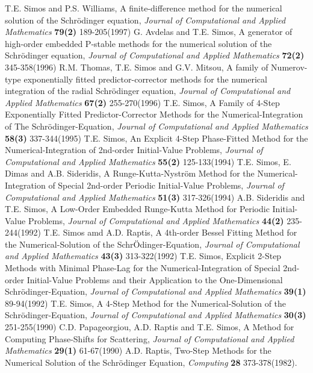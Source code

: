 \documentclass[numreferences]{kluwer}
\begin{document}
\begin{article}
\begin{thebibliography}{120}
 T.E. Simos and P.S. Williams, A finite-difference method for the numerical solution of the Schr\"odinger equation, {\it Journal of Computational and Applied Mathematics} {\bf 79(2)} 189-205(1997)
 G. Avdelas and T.E. Simos, A generator of high-order embedded P-stable methods for the numerical solution of the
Schr\"odinger equation, {\it Journal of Computational and Applied
Mathematics} {\bf 72(2)}  345-358(1996)
 R.M. Thomas, T.E. Simos and G.V. Mitsou, A family of Numerov-type exponentially fitted predictor-corrector methods for the
numerical integration of the radial Schr\"odinger equation, {\it
Journal of Computational and Applied Mathematics} {\bf 67(2)}
255-270(1996)
 T.E. Simos, A Family of 4-Step Exponentially Fitted Predictor-Corrector Methods for the Numerical-Integration of
The Schr\"odinger-Equation, {\it Journal of Computational and
Applied Mathematics} {\bf 58(3)}   337-344(1995)
 T.E. Simos, An Explicit 4-Step Phase-Fitted Method for the Numerical-Integration of 2nd-order Initial-Value Problems, {\it Journal of Computational and Applied Mathematics} {\bf 55(2)} 125-133(1994)
 T.E. Simos, E. Dimas and A.B. Sideridis, A Runge-Kutta-Nystr\"om Method for the Numerical-Integration of Special 2nd-order
Periodic Initial-Value Problems, {\it Journal of Computational and
Applied Mathematics} {\bf 51(3)} 317-326(1994)
 A.B. Sideridis and T.E. Simos, A Low-Order Embedded Runge-Kutta Method for Periodic Initial-Value Problems, {\it Journal of Computational and Applied Mathematics} {\bf 44(2)} 235-244(1992)
 T.E. Simos amd A.D. Raptis, A 4th-order Bessel Fitting Method for the Numerical-Solution of the Schr\"Odinger-Equation, {\it
Journal of Computational and Applied Mathematics} {\bf 43(3)}
313-322(1992)
 T.E. Simos, Explicit 2-Step Methods with Minimal Phase-Lag for the Numerical-Integration of Special 2nd-order Initial-Value
Problems and their Application to the One-Dimensional
Schr\"odinger-Equation, {\it Journal of Computational and Applied
Mathematics} {\bf 39(1)} 89-94(1992)
 T.E. Simos, A 4-Step Method for the Numerical-Solution of the Schr\"odinger-Equation, {\it Journal of Computational and Applied Mathematics} {\bf 30(3)} 251-255(1990)
 C.D. Papageorgiou, A.D. Raptis and T.E. Simos, A Method for Computing Phase-Shifts for Scattering, {\it Journal of Computational and Applied
Mathematics} {\bf 29(1)} 61-67(1990)
 A.D. Raptis, Two-Step Methods for the Numerical Solution  of the Schr\"odinger Equation, {\it Computing} {\bf 28} 373-378(1982).

\end{thebibliography}
\end{article}
\end{document}
